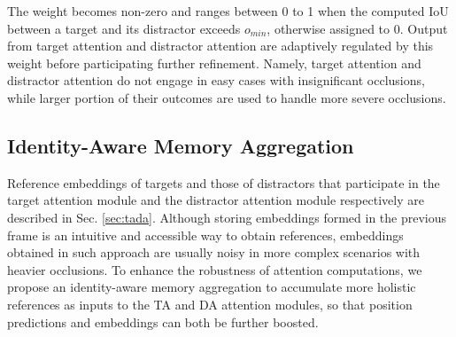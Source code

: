 \documentclass[final]{cvpr}
\begin{document}
The weight becomes non-zero and ranges between 0 to 1 when the computed IoU between a target and its distractor exceeds \(o_{min}\), otherwise assigned to 0. Output from target attention and distractor attention are adaptively regulated by this weight before participating further refinement.
Namely, target attention and distractor attention do not engage in easy cases with insignificant occlusions, while larger portion of their outcomes are used to handle more severe occlusions.

\subsection{Identity-Aware Memory Aggregation}
\label{sec:aggregation}
Reference embeddings of targets and those of distractors that participate in the target attention module and the distractor attention module respectively are described in Sec. \ref{sec:tada}. Although storing embeddings formed in the previous frame is an intuitive and accessible way to obtain references, embeddings obtained in such approach are usually noisy in more complex scenarios with heavier occlusions. To enhance the robustness of attention computations, we propose an identity-aware memory aggregation to accumulate more holistic references as inputs to the TA and DA attention modules, so that position predictions and embeddings can both be further boosted.
\end{document}

